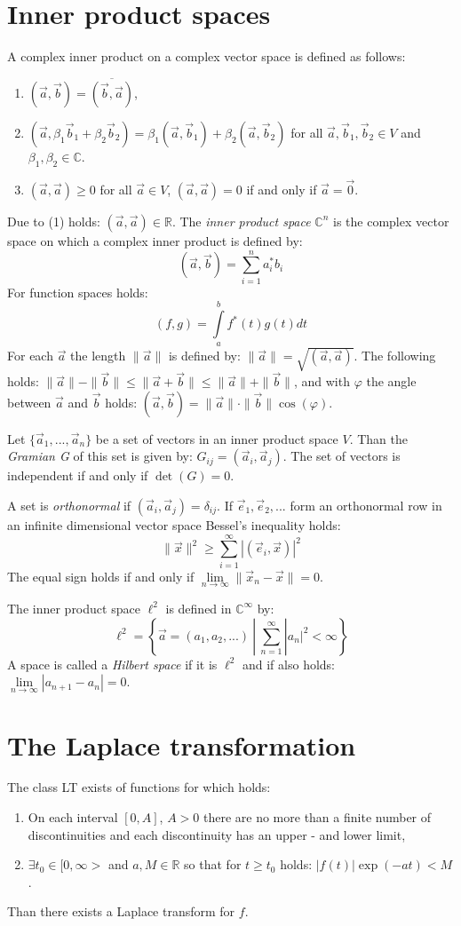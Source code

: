\section{Inner product spaces}
A complex inner product on a complex vector space is defined as follows:
\begin{enumerate}
	\item $(\vec{a},\vec{b})=\overline{(\vec{b},\vec{a})}$,
	\item $(\vec{a},\beta_1\vec{b}_1+\beta_2\vec{b}_2)=\beta_1(\vec{a},\vec{b}_1)+\beta_2(\vec{a},\vec{b}_2)$
	for all $\vec{a},\vec{b}_1,\vec{b}_2\in V$ and $\beta_1,\beta_2\in\mathbb{C}$.
	\item $(\vec{a},\vec{a})\geq0$ for all $\vec{a}\in V$,
	$(\vec{a},\vec{a})=0$ if and only if $\vec{a}=\vec{0}$.
\end{enumerate}
Due to (1) holds: $(\vec{a},\vec{a})\in \mathbb{R}$. The {\it inner product space} $\mathbb{C}^n$ is
the complex vector space on which a complex inner product is defined by:
\[
(\vec{a},\vec{b})=\sum_{i=1}^na_i^*b_i
\]
For function spaces holds:
\[
(f,g)=\int\limits_a^bf^*(t)g(t)dt
\]
For each $\vec{a}$ the length $\|\vec{a}\|$ is defined by:
$\|\vec{a}\|=\sqrt{(\vec{a},\vec{a})}$. The following holds:
$\|\vec{a}\|-\|\vec{b}\|\leq\|\vec{a}+\vec{b}\|\leq\|\vec{a}\|+\|\vec{b}\|$,
and with $\varphi$ the angle between $\vec{a}$ and $\vec{b}$ holds:
$(\vec{a},\vec{b})=\|\vec{a}\|\cdot\|\vec{b}\|\cos(\varphi)$.
 
Let $\{\vec{a}_1,...,\vec{a}_n\}$ be a set of vectors in an inner product space
$V$. Than the {\it Gramian G} of this set is given by: $G_{ij}=(\vec{a}_i,\vec{a}_j)$.
The set of vectors is independent if and only if $\det(G)=0$.
 
A set is {\it orthonormal} if $(\vec{a}_i,\vec{a}_j)=\delta_{ij}$.
If $\vec{e}_1,\vec{e}_2,...$ form an orthonormal row in an infinite dimensional
vector space Bessel's inequality holds:
\[
\|\vec{x}\|^2\geq\sum_{i=1}^\infty|(\vec{e}_i,\vec{x})|^2
\]
The equal sign holds if and only if
$\lim\limits_{n\rightarrow\infty}\|\vec{x}_n-\vec{x}\|=0$.
 
The inner product space $\ell^2$ is defined in $\mathbb{C}^\infty$ by:
\[
\ell^2=\left\{\vec{a}=(a_1,a_2,...)~|~\sum_{n=1}^\infty|a_n|^2<\infty\right\}
\]
A space is called a {\it Hilbert space} if it is $\ell^2$ and if also holds:
$\lim\limits_{n\rightarrow\infty}|a_{n+1}-a_n|=0$.

\section{The Laplace transformation}
The class LT exists of functions for which holds:
\begin{enumerate}
	\item On each interval $[0,A]$, $A>0$ there are no more than a finite number of
	discontinuities and each discontinuity has an upper - and lower limit,
	\item $\exists t_0\in[0,\infty>$ and $a,M\in \mathbb{R}$ so that for $t\geq t_0$
	holds: $|f(t)|\exp(-at)<M$.
\end{enumerate}
Than there exists a Laplace transform for $f$.
 
